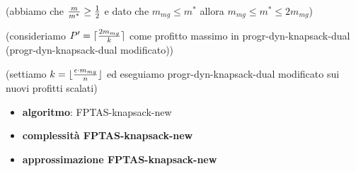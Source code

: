 (abbiamo che \({m \over m^*} \geq {1 \over 2}\) e dato che
\(m_{mg} \leq m^*\) allora \(m_{mg} \leq m^* \leq 2m_{mg}\))

(consideriamo \(P' = \lceil {{2m_{mg}} \over {k}} \rceil\) come profitto
massimo in progr-dyn-knapsack-dual (progr-dyn-knapsack-dual modificato))

(settiamo \(k = \lfloor {{\epsilon \cdot m_{mg}} \over {n}} \rfloor\) ed
eseguiamo progr-dyn-knapsack-dual modificato sui nuovi profitti scalati)

\begin{itemize}

\item
  \textbf{algoritmo}: FPTAS-knapsack-new
\item
  \textbf{complessità FPTAS-knapsack-new}
\item
  \textbf{approssimazione FPTAS-knapsack-new}
\end{itemize}

